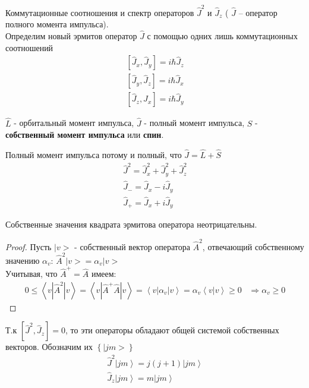 \documentclass[__main__.tex]{subfiles}
\begin{document}
	
	Коммутационные соотношения и спектр операторов $\hat{J}^2$ и $\hat{J}_z$ ( $\hat{J}$ -- оператор полного момента импульса).\\ 
	
	Определим новый эрмитов оператор $\hat{J}$ с помощью одних лишь коммутационных соотношений
	\begin{gather*}
		\left[\hat{J}_x,\hat{J}_y\right] = i\hbar\hat{J}_z\\
		\left[\hat{J}_y,\hat{J}_z\right] = i\hbar\hat{J}_x\\
		\left[\hat{J}_z,\hat{J}_x\right] = i\hbar\hat{J}_y
	\end{gather*}
	\begin{definition}
		$\hat{L}$ -  орбитальный момент импульса, $\hat{J}$ - полный момент импульса, $\hat{S}$ - \textbf{собственный момент импульса} или \textbf{спин}.
	\end{definition}
	Полный момент импульса потому и полный, что $\hat{J} = \hat{L}+\hat{S}$
	\begin{gather*}
		\hat{J}^2 = \hat{J}^2_x+\hat{J}^2_y+\hat{J}^2_z\\
		\hat{J}_{-} = \hat{J}_x-i\hat{J}_y\\
		\hat{J}_{+} = \hat{J}_x+i\hat{J}_y
	\end{gather*}
	\begin{theorem}
		Собственные значения квадрата эрмитова оператора неотрицательны.
	\end{theorem}
	\begin{proof}
		Пусть $|v>$ - собственный вектор оператора $\hat{A}^2$, отвечающий собственному значению $\alpha_v$: $\hat{A}^2|v> = \alpha_v|v>$\\
		Учитывая, что $\hat{A}^{+} = \hat{A}$ имеем:
		\begin{gather*}
			0 \leq \left<v|\hat{A}^2|v\right> = \left<v|\hat{A}^{+}\hat{A}|v\right> = \left<v|\alpha_v|v\right> = \alpha_v\left<v|v\right> \geq 0\;\;\;\Rightarrow \alpha_v \geq 0
		\end{gather*} 
	\end{proof}
	Т.к $\left[\hat{J}^2,\hat{J}_z\right] = 0$, то эти операторы обладают общей системой собственных векторов. Обозначим их $\left\{|jm>\right\}$
	\begin{gather*}
		\hat{J}^2\left|jm\right> = j(j+1)\left|jm\right>\\
		\hat{J}_z\left|jm\right> = m\left|jm\right>
	\end{gather*} 
\end{document}
